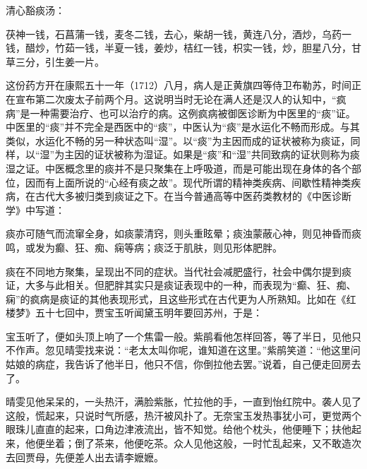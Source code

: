 
\begin{bookquote}清心豁痰汤：\end{bookquote}


\begin{bookquote}茯神一钱，石菖蒲一钱，麦冬二钱，去心，柴胡一钱，黄连八分，酒炒，乌药一钱，醋炒，竹茹一钱，半夏一钱，姜炒，桔红一钱，枳实一钱，炒，胆星八分，甘草三分，引生姜一片。\end{bookquote}


这份药方开在康熙五十一年（1712）八月，病人是正黄旗四等侍卫布勒苏，时间正在宣布第二次废太子前两个月。这说明当时无论在满人还是汉人的认知中，“疯病”是一种需要治疗、也可以治疗的病。这例疯病被御医诊断为中医里的“痰”证。中医里的“痰”并不完全是西医中的“痰”，中医认为“痰”是水运化不畅而形成。与其类似，水运化不畅的另一种状态叫“湿”。以“痰”为主因而成的证状被称为痰证，同样，以“湿”为主因的证状被称为湿证。如果是“痰”和“湿”共同致病的证状则称为痰湿之证。中医概念里的痰并不是只聚集在上呼吸道，而是可能出现在身体的各个部位，因而有上面所说的“心经有痰之故”。现代所谓的精神类疾病、间歇性精神类疾病，在古代大多被归类到痰证之下。在当今普通高等中医药类教材的《中医诊断学》中写道：



\begin{bookquote}痰亦可随气而流窜全身，如痰蒙清窍，则头重眩晕；痰浊蒙蔽心神，则见神昏而痰鸣，或发为癫、狂、痴、痫等病；痰泛于肌肤，则见形体肥胖。\end{bookquote}


痰在不同地方聚集，呈现出不同的症状。当代社会减肥盛行，社会中偶尔提到痰证，大多与此相关。但肥胖其实只是痰证表现中的一种，而表现为“癫、狂、痴、痫”的疯病是痰证的其他表现形式，且这些形式在古代更为人所熟知。比如在《红楼梦》五十七回中，贾宝玉听闻黛玉明年要回苏州，于是：



\begin{bookquote}宝玉听了，便如头顶上响了一个焦雷一般。紫鹃看他怎样回答，等了半日，见他只不作声。忽见晴雯找来说：“老太太叫你呢，谁知道在这里。”紫鹃笑道：“他这里问姑娘的病症，我告诉了他半日，他只不信，你倒拉他去罢。”说着，自己便走回房去了。\end{bookquote}


\begin{bookquote}晴雯见他呆呆的，一头热汗，满脸紫胀，忙拉他的手，一直到怡红院中。袭人见了这般，慌起来，只说时气所感，热汗被风扑了。无奈宝玉发热事犹小可，更觉两个眼珠儿直直的起来，口角边津液流出，皆不知觉。给他个枕头，他便睡下；扶他起来，他便坐着；倒了茶来，他便吃茶。众人见他这般，一时忙乱起来，又不敢造次去回贾母，先便差人出去请李嬷嬷。\end{bookquote}

